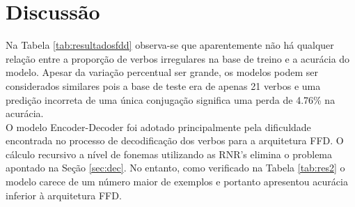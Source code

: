 

\section{Discussão}
\label{sec:disc}

Na Tabela \ref{tab:resultadosfdd} observa-se que aparentemente não há qualquer relação entre a proporção de verbos irregulares na base de treino e a acurácia do modelo. Apesar da variação percentual ser grande, os modelos podem ser considerados similares pois a base de teste era de apenas 21 verbos e uma predição incorreta de uma única conjugação significa uma perda de 4.76\% na acurácia.\\ 

O modelo Encoder-Decoder foi adotado principalmente pela dificuldade encontrada no processo de decodificação dos verbos para a arquitetura FFD. O cálculo recursivo a nível de fonemas utilizando as RNR's elimina o problema apontado na Seção \ref{sec:dec}. No entanto, como verificado na Tabela \ref{tab:res2} o modelo carece de um número maior de exemplos e portanto apresentou acurácia inferior à arquitetura FFD.\\ 

